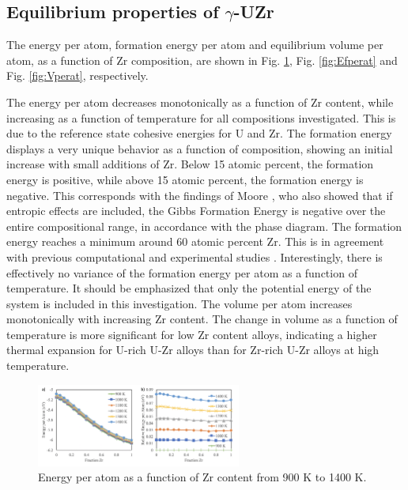 \documentclass[review]{elsarticle}
\begin{document}
\subsection{Equilibrium properties of $\gamma$-UZr}\label{sec:res1}

The energy per atom, formation energy per atom and equilibrium volume per atom, as a function of Zr composition, are shown in Fig. \ref{fig:Eperat}, Fig. \ref{fig:Efperat} and Fig. \ref{fig:Vperat}, respectively. 

The energy per atom decreases monotonically as a function of Zr content, while increasing as a function of temperature for all compositions investigated. This is due to the reference state cohesive energies for U and Zr. The formation energy displays a very unique behavior as a function of composition, showing an initial increase with small additions of Zr. Below 15 atomic percent, the formation energy is positive, while above 15 atomic percent, the formation energy is negative. This corresponds with the findings of Moore \cite{moore2015}, who also showed that if entropic effects are included, the Gibbs Formation Energy is negative over the entire compositional range, in accordance with the phase diagram. The formation energy reaches a minimum around 60 atomic percent Zr. This is in agreement with previous computational and experimental studies \cite{moore2015}. Interestingly, there is effectively no variance of the formation energy per atom as a function of temperature. It should be emphasized that only the potential energy of the system is included in this investigation. The volume per atom increases monotonically with increasing Zr content. The change in volume as a function of temperature is more significant for low Zr content alloys, indicating a higher thermal expansion for U-rich U-Zr alloys than for Zr-rich U-Zr alloys at high temperature. 

\begin{figure}[!htp]
\begin{center}
\includegraphics[width=0.6\textwidth]{1_Eperat}
\end{center}
\caption{Energy per atom as a function of Zr content from 900 K to 1400 K. }
\label{fig:Eperat}
\end{figure}
\end{document}
